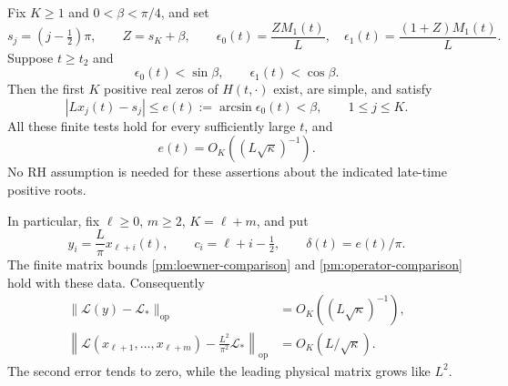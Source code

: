 \begin{theorem}
\label{pm:theta-clock}
Fix \(K\ge1\) and \(0<\beta<\pi/4\), and set
\begin{equation}
 s_j=(j-\tfrac12)\pi,\qquad Z=s_K+\beta,\qquad
 \epsilon_0(t)=\frac{ZM_1(t)}L,\quad
 \epsilon_1(t)=\frac{(1+Z)M_1(t)}L.
 \label{pm:theta-finite-errors}
\end{equation}
Suppose \(t\ge t_2\) and
\begin{equation}
 \epsilon_0(t)<\sin\beta,\qquad
 \epsilon_1(t)<\cos\beta.
 \label{pm:theta-finite-tests}
\end{equation}
Then the first \(K\) positive real zeros of \(H(t,\cdot)\) exist,
are simple, and satisfy
\begin{equation}
 |Lx_j(t)-s_j|\le e(t):=\arcsin\epsilon_0(t)<\beta,
             \qquad1\le j\le K.
 \label{pm:theta-root-enclosure}
\end{equation}
All these finite tests hold for every sufficiently large \(t\), and
\begin{equation}
 e(t)=O_K((L\sqrt\kappa)^{-1}).
 \label{pm:theta-root-rate}
\end{equation}
No RH assumption is needed for these assertions about the indicated
late-time positive roots.

In particular, fix \(\ell\ge0\), \(m\ge2\), \(K=\ell+m\), and
put
\begin{equation}
 y_i=\frac L\pi x_{\ell+i}(t),\qquad
 c_i=\ell+i-\tfrac12,\qquad \delta(t)=e(t)/\pi.
 \label{pm:theta-clock-coordinates}
\end{equation}
The finite matrix bounds \eqref{pm:loewner-comparison} and
\eqref{pm:operator-comparison} hold with these data.  Consequently
\begin{align}
 \|\mathcal L(y)-\mathcal L_*\|_{\mathrm{op}}
    &=O_K((L\sqrt\kappa)^{-1}),
 \label{pm:theta-normalized-matrix-rate}\\
 \left\|\mathcal L(x_{\ell+1},\ldots,x_{\ell+m})
                -\frac{L^2}{\pi^2}\mathcal L_*\right\|_{\mathrm{op}}
    &=O_K(L/\sqrt\kappa).
 \label{pm:theta-physical-matrix-rate}
\end{align}
The second error tends to zero, while the leading physical matrix grows
like \(L^2\).
\end{theorem}

